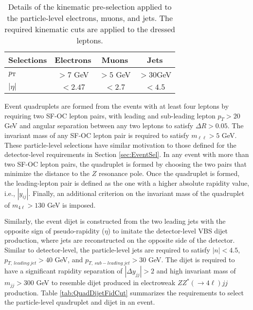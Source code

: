 \begin{table}[htbp]
    \centering
    \caption{Details of the kinematic pre-selection applied to the particle-level electrons, muons, and jets. The required kinematic cuts are applied to the dressed leptons.
    \label{tab:FidObjectCut}}
    \begin{tabular}{|| l || c | c | c ||}
        \hline
        Selections      & Electrons             &       Muons        &          Jets            \\
        \hline\hline
        $p_{\textrm{T} ~}$          & $> 7$ GeV             &       $ >5$ GeV    &      $>30$GeV        \\
        \hline 
        $|\eta|$            &  $< 2.47  $           &       $ < 2.7 $        &      $ < 4.5$            \\
        \hline
    \end{tabular}
\end{table}  

Event quadruplets are formed from the events with at least four leptons by requiring two SF-OC lepton pairs, with leading and sub-leading lepton $p_{T}>20$ GeV and angular separation between any two leptons to satisfy $\Delta R > 0.05$. The invariant mass of any SF-OC lepton pair is required to satisfy $m_{\ell \ell } > 5$ GeV. These particle-level selections have similar motivation to those defined for the detector-level requirements in Section \ref{sec:EventSel}. In any event with more than two SF-OC lepton pairs, the quadruplet is formed by choosing the two pairs that minimize the distance to the $Z$ resonance pole. Once the quadruplet is formed, the leading-lepton pair is defined as the one with a higher absolute rapidity value, i.e., $|y_{ij}|$. Finally, an additional criterion on the invariant mass of the quadruplet of $m_{4\ell} > 130$ GeV is imposed. 

Similarly, the event dijet is constructed from the two leading jets with the opposite sign of pseudo-rapidity ($\eta$) to imitate the detector-level VBS dijet production, where jets are reconstructed on the opposite side of the detector. Similar to detector-level, the particle-level jets are required to satisfy $|n| < 4.5$, $p_{T,~leading~jet} > 40$ GeV, and $p_{T,~sub-leading~jet} > 30$ GeV. The dijet is required to have a significant rapidity separation of $|\Delta y_{jj}| > 2$ and high invariant mass of $m_{jj} > 300$ GeV to resemble dijet produced in electroweak $ZZ^*(\rightarrow 4 \ell) jj$ production. Table \ref{tab:QuadDijetFidCut} summarizes the requirements to select the particle-level quadruplet and dijet in an event.           
    
